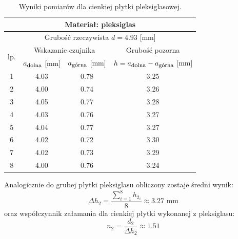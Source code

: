 \documentclass[a4paper,12pts]{article}
\begin{document}
		\begin{table}[!h]
		\centering
		\begin{tabular}{| c | c | c | c |}
			\hline
			\multicolumn{4}{|c|}{Materiał: pleksiglas}  \\ \hline
			\multicolumn{4}{|c|}{Grubość rzeczywista $d = 4.93$ [mm] } \\ \hline
			\multirow{2}{*}{lp.} & \multicolumn{2}{|c|}{Wskazanie czujnika} & Grubość pozorna \\ \cline{2-4}
			& $a_{\textrm{\footnotesize dolna}}$ [mm] & $a_{\textrm{\footnotesize górna}}$ [mm] & $h = a_{\textrm{\footnotesize dolna}} - a_{\textrm{\footnotesize górna}}$ [mm] \\ \hline
			1  & 4.03 & 0.78 & 3.25 \\ \hline
			2  & 4.00 & 0.74 & 3.26 \\ \hline
			3  & 4.05 & 0.77 & 3.28 \\ \hline
			4  & 4.03 & 0.76 & 3.27 \\ \hline
			5  & 4.04 & 0.77 & 3.27 \\ \hline
			6  & 4.02 & 0.72 & 3.30 \\ \hline
			7  & 4.02 & 0.73 & 3.29 \\ \hline
			8  & 4.00 & 0.76 & 3.24 \\ \hline
		\end{tabular}
		\caption{Wyniki pomiarów dla cienkiej płytki pleksiglasowej.}
		\label{chudy_pleksi}
	\end{table}
	
	Analogicznie do grubej płytki pleksiglasu obliczony zostaje średni wynik: 
	\begin{equation}
		\Delta h_2 = \frac{\sum_{i = 1}^{8} h_{2_i}}{8} \approx 3.27 \textrm{ mm}
	\end{equation}
	oraz współczynnik załamania dla cienkiej płytki wykonanej z pleksiglasu:
		\begin{equation}
	n_2 = \frac{d_2}{\Delta h_2} \approx 1.51
	\end{equation}
	
\end{document}
